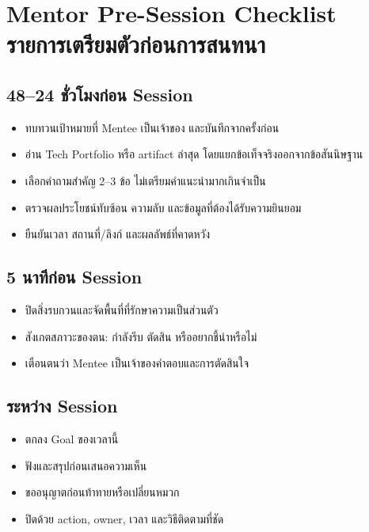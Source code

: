 \chapter{Mentor Pre-Session Checklist\\รายการเตรียมตัวก่อนการสนทนา}

\section*{48--24 ชั่วโมงก่อน Session}
\begin{itemize}
  \item[$\square$] ทบทวนเป้าหมายที่ Mentee เป็นเจ้าของ และบันทึกจากครั้งก่อน
  \item[$\square$] อ่าน Tech Portfolio หรือ artifact ล่าสุด โดยแยกข้อเท็จจริงออกจากข้อสันนิษฐาน
  \item[$\square$] เลือกคำถามสำคัญ 2--3 ข้อ ไม่เตรียมคำแนะนำมากเกินจำเป็น
  \item[$\square$] ตรวจผลประโยชน์ทับซ้อน ความลับ และข้อมูลที่ต้องได้รับความยินยอม
  \item[$\square$] ยืนยันเวลา สถานที่/ลิงก์ และผลลัพธ์ที่คาดหวัง
\end{itemize}

\section*{5 นาทีก่อน Session}
\begin{itemize}
  \item[$\square$] ปิดสิ่งรบกวนและจัดพื้นที่ที่รักษาความเป็นส่วนตัว
  \item[$\square$] สังเกตสภาวะของตน: กำลังรีบ ตัดสิน หรืออยากชี้นำหรือไม่
  \item[$\square$] เตือนตนว่า Mentee เป็นเจ้าของคำตอบและการตัดสินใจ
\end{itemize}

\section*{ระหว่าง Session}
\begin{itemize}
  \item[$\square$] ตกลง Goal ของเวลานี้
  \item[$\square$] ฟังและสรุปก่อนเสนอความเห็น
  \item[$\square$] ขออนุญาตก่อนท้าทายหรือเปลี่ยนหมวก
  \item[$\square$] ปิดด้วย action, owner, เวลา และวิธีติดตามที่ชัด
\end{itemize}

